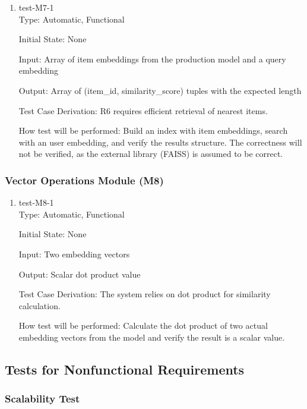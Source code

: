 \documentclass[12pt, titlepage]{article}
\begin{document}
\begin{enumerate}

\item{test-M7-1\\}
Type: Automatic, Functional
					
Initial State: None
					
Input: Array of item embeddings from the production model and a query embedding
					
Output: Array of (item\_id, similarity\_score) tuples with the expected length

Test Case Derivation: R6 requires efficient retrieval of nearest items.

How test will be performed: Build an index with item embeddings, search with an user embedding, and verify the results structure. The correctness will not be verified, as the external library (FAISS) is assumed to be correct.

\end{enumerate}

\subsubsection{Vector Operations Module (M8)}

\begin{enumerate}

\item{test-M8-1\\}
Type: Automatic, Functional
					
Initial State: None
					
Input: Two embedding vectors
					
Output: Scalar dot product value

Test Case Derivation: The system relies on dot product for similarity calculation.

How test will be performed: Calculate the dot product of two actual embedding vectors from the model and verify the result is a scalar value.

\end{enumerate}

\subsection{Tests for Nonfunctional Requirements}


\subsubsection{Scalability Test}
\end{document}
